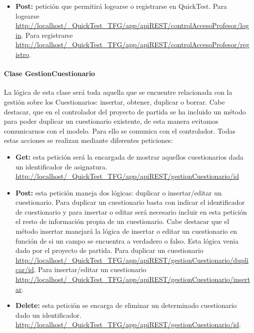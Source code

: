 \begin{itemize}

	\item \textbf{Post:} petición que permitirá logearse o registrarse en QuickTest. Para logearse \url{http://localhost/_QuickTest_TFG/app/apiREST/controlAccesoProfesor/login}. Para registrarse \url{http://localhost/_QuickTest_TFG/app/apiREST/controlAccesoProfesor/registro}.
	
\end{itemize}


\paragraph{Clase GestionCuestionario}

La lógica de esta clase será toda aquella que se encuentre relacionada con la gestión sobre los Cuestionarios: insertar, obtener, duplicar o borrar. Cabe destacar, que en el controlador del proyecto de partida se ha incluido un método para poder duplicar un cuestionario existente, de esta manera evitamos comunicarnos con el modelo.
Para ello se comunica con el controlador. Todas estas acciones se realizan mediante diferentes peticiones:

\begin{itemize}

	\item \textbf{Get:} esta petición será la encargada de mostrar aquellos cuestionarios dada un identificador de asignatura. \url{http://localhost/_QuickTest_TFG/app/apiREST/gestionCuestionario/id}
	\item \textbf{Post:} esta petición maneja dos lógicas: duplicar o insertar/editar un cuestionario. Para duplicar un cuestionario basta con indicar el identificador de cuestionario y para insertar o editar será necesario incluir en esta petición el resto de información propia de un cuestionario. Cabe destacar que el método insertar manejará la lógica de insertar o editar un cuestionario en función de si un campo se encuentra a verdadero o falso. Esta lógica venia dado por el proyecto de partida. Para duplicar un cuestionario \url{http://localhost/_QuickTest_TFG/app/apiREST/gestionCuestionario/duplicar/id}. \linebreak Para insertar/editar un cuestionario \url{http://localhost/_QuickTest_TFG/app/apiREST/gestionCuestionario/insertar}.
	
	\item \textbf{Delete:} esta petición se encarga de eliminar un determinado cuestionario dado un identificador. \url{http://localhost/_QuickTest_TFG/app/apiREST/gestionCuestionario/id}.

\end{itemize}

